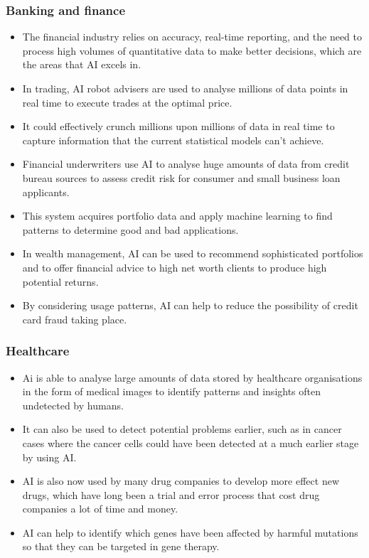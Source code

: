 \documentclass[11pt]{article}
\begin{document}
\subsubsection{Banking and finance}
\label{sec:orga1425a9}
\begin{itemize}
\item The financial industry relies on accuracy, real-time reporting, and the need to process high volumes of quantitative data to make better decisions, which are the areas that AI excels in.
\item In trading, AI robot advisers are used to analyse millions of data points in real time to execute trades at the optimal price.
\item It could effectively crunch millions upon millions of data in real time to capture information that the current statistical models can't achieve.
\item Financial underwriters use AI to analyse huge amounts of data from credit bureau sources to assess credit risk for consumer and small business loan applicants.
\item This system acquires portfolio data and apply machine learning to find patterns to determine good and bad applications.
\item In wealth management, AI can be used to recommend sophisticated portfolios and to offer financial advice to high net worth clients to produce high potential returns.
\item By considering usage patterns, AI can help to reduce the possibility of credit card fraud taking place.
\end{itemize}
\subsubsection{Healthcare}
\label{sec:orge88a165}
\begin{itemize}
\item Ai is able to analyse large amounts of data stored by healthcare organisations in the form of medical images to identify patterns and insights often undetected by humans.
\item It can also be used to detect potential problems earlier, such as in cancer cases where the cancer cells could have been detected at a much earlier stage by using AI.
\item AI is also now used by many drug companies to develop more effect new drugs, which have long been a trial and error process that cost drug companies a lot of time and money.
\item AI can help to identify which genes have been affected by harmful mutations so that they can be targeted in gene therapy.
\end{itemize}
\end{document}

